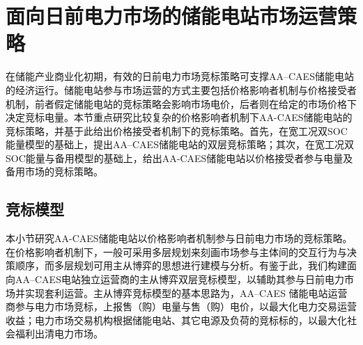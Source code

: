 

\section{面向日前电力市场的储能电站市场运营策略}
\label{sec:chap3-bid-aa-caes}
在储能产业商业化初期，有效的日前电力市场竞标策略可支撑AA–CAES储能电站的经济运行\cite{CAES-DAM-Rui-18}。储能电站参与市场运营的方式主要包括价格影响者机制与价格接受者机制，前者假定储能电站的竞标策略会影响市场电价，后者则在给定的市场价格下决定竞标电量。本节重点研究比较复杂的价格影响者机制下AA-CAES储能电站的竞标策略，并基于此给出价格接受者机制下的竞标策略。首先，在宽工况双SOC能量模型的基础上，提出AA–CAES储能电站的双层竞标策略；其次，在宽工况双SOC能量与备用模型的基础上，给出AA-CAES储能电站以价格接受者参与电量及备用市场的竞标策略。

\subsection{竞标模型}
\label{sec:chap3-bid-aa-caes-game}
本小节研究AA-CAES储能电站以价格影响者机制参与日前电力市场的竞标策略。在价格影响者机制下，一般可采用多层规划来刻画市场参与主体间的交互行为与决策顺序，而多层规划可用主从博弈的思想进行建模与分析\cite{Game-Mei-16}。有鉴于此，我们构建面向AA–CAES电站独立运营商的主从博弈双层竞标模型，以辅助其参与日前电力市场并实现套利运营。主从博弈竞标模型的基本思路为，AA–CAES 储能电站运营商参与电力市场竞标，上报售（购）电量与售（购）电价，以最大化电力交易运营收益；电力市场交易机构根据储能电站、其它电源及负荷的竞标标的，以最大化社会福利出清电力市场。


